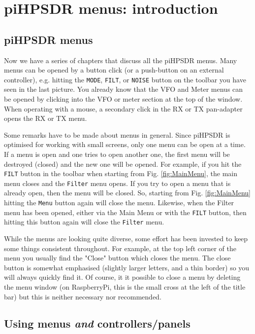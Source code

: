 \documentclass[12pt]{book}
\def\rett#1{\texttt{\color{red}#1}}
\def\bltt#1{\texttt{\color{blue}#1}}
\def\pH{pi\-HPSDR\xspace}
\begin{document}
\chapter{\pH menus: introduction}

\section{\pH menus}
Now we have a series of chapters that discuss all the \pH menus. Many menus can be
opened by a button click (or a push-button on an external controller), e.g. hitting the
\rett{MODE}, \rett{FILT}, or \rett{NOISE} button on the
toolbar you have seen in the last picture. You already know that the VFO and Meter
menus can be opened by clicking into the VFO or meter section at the top of the window.
When operating with a mouse, a secondary click in the RX or TX pan-adapter opens the
RX or TX menu.

Some remarks have to be made about menus in general. Since \pH is optimised for
working with small screens, only one menu can be open at a time. If a menu is open
and one tries to open another one, the first menu will be destroyed (closed) and the
new one will be opened. For example, if you hit the \rett{FILT} button in the toolbar
when starting from Fig. \ref{fig:MainMenu}, the main menu closes and the \bltt{Filter} menu
opens. If you try to open a menu that is already open, then the menu will be closed.
So, starting from Fig. \ref{fig:MainMenu} hitting the \rett{Menu} button again will close
the menu. Likewise, when the Filter menu has been opened, either via the Main Menu
or with the \rett{FILT} button, then hitting this button again will close the
\bltt{Filter} menu.

While the menus are looking quite diverse, some effort has been invested to keep
some things consistent throughout. For example, at the top left corner of the menu
you usually find the "Close" button which closes the menu. The close button is somewhat
emphasised (slightly larger letters, and a thin border) so you will always quickly find it.
Of course, it it possible to close a menu by deleting the menu window (on RaspberryPi,
this is the small cross at the left of the title bar) but this is neither necessary nor
recommended.

\section{Using menus \textit{and} controllers/panels}
\end{document}
